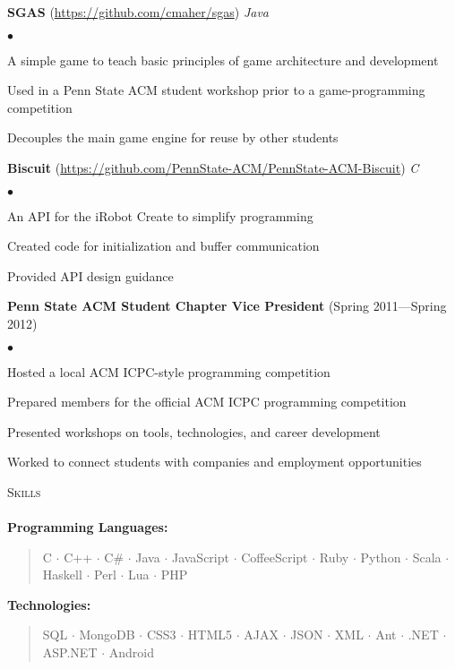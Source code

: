 \documentclass{article}
\newcommand{\skill}[2]{\textbf{#1:}  \begin{verse}#2\end{verse} }
\newcommand{\lineunder}{\vspace*{-8pt} \\ \hspace*{-18pt} \hrulefill \\}
\newcommand{\header}[1]{{\hspace*{-15pt}\vspace*{6pt} \textsc{#1}} \vspace*{-6pt} \lineunder}
\newcommand{\project}[3]{{ \textbf{#1} (\url{#2}) \hfill \textit{#3} \\ }}
\newcommand{\activity}[2]{{ \textbf{#1} (#2) \hfill \\ }}
\newenvironment{achievements}{\begin{list}{$\bullet$}{\topsep 0pt \itemsep -2pt}}{\vspace*{4pt}\end{list}}
\begin{document}
\project{SGAS}{https://github.com/cmaher/sgas}{Java}
    \begin{achievements}
    \item A simple game to teach basic principles of game architecture and development
    \item Used in a Penn State ACM student workshop prior to a game-programming competition
    \item Decouples the main game engine for reuse by other students
    \end{achievements}

\project{Biscuit}{https://github.com/PennState-ACM/PennState-ACM-Biscuit}{C}
    \begin{achievements}
    \item An API for the iRobot Create to simplify programming 
    \item Created code for initialization and buffer communication
    \item Provided API design guidance
    \end{achievements}

\activity{Penn State ACM Student Chapter Vice President}{Spring 2011---Spring 2012}
    \begin{achievements}
    \item Hosted a local ACM ICPC-style programming competition
    \item Prepared members for the official ACM ICPC programming competition
    \item Presented workshops on tools, technologies, and career development
    \item Worked to connect students with companies and employment opportunities
    \end{achievements}

\header{Skills}
    \skill{Programming Languages}{C $\cdot$ C++ $\cdot$ C\# $\cdot$ Java $\cdot$ JavaScript $\cdot$ CoffeeScript  
        $\cdot$ Ruby $\cdot$ Python $\cdot$ Scala $\cdot$ Haskell $\cdot$ Perl $\cdot$ Lua $\cdot$ PHP}
    \skill{Technologies}{SQL $\cdot$ MongoDB $\cdot$ CSS3 $\cdot$ HTML5 $\cdot$ AJAX $\cdot$ JSON 
        $\cdot$ XML $\cdot$ Ant $\cdot$ .NET $\cdot$ ASP.NET $\cdot$ Android}

\vspace*{44pt}
\end{document}
